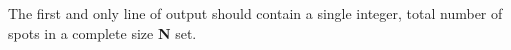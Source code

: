 The first and only line of output should contain a single integer, total number of spots in a complete size \textbf{N} set.